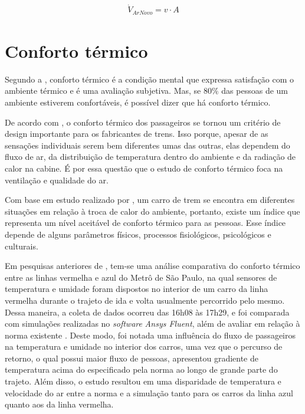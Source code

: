 \documentclass[acronym,symbols,table]{fei}
\begin{document}
\begin{equation} \label{eq:veloc}
\begin{aligned}
   \dot{V}_{ArNovo}=v\cdot{A}
\end{aligned}
\end{equation}

\section{Conforto térmico} \label{confortotermico}

Segundo a \textcite{ASHRAE2009}, conforto térmico é a condição mental que expressa satisfação com o ambiente térmico e é uma avaliação subjetiva. Mas, se $80\%$ das pessoas de um ambiente estiverem confortáveis, é possível dizer que há conforto térmico.

De acordo com \textcite{konstantinov2015numerical}, o conforto térmico dos passageiros se tornou um critério de design importante para os fabricantes de trens. Isso porque, apesar de as sensações individuais serem bem diferentes umas das outras, elas dependem do fluxo de ar, da distribuição de temperatura dentro do ambiente e da radiação de calor na cabine. É por essa questão que o estudo de conforto térmico foca na ventilação e qualidade do ar.

Com base em estudo realizado por \textcite{casellisimulaccao}, um carro de trem se encontra em diferentes situações em relação à troca de calor do ambiente, portanto, existe um índice que representa um nível aceitável de conforto térmico para as pessoas. Esse índice depende de alguns parâmetros físicos, processos fisiológicos, psicológicos e culturais. 

Em pesquisas anteriores de \textcite{TCCThomas}, tem-se uma análise comparativa do conforto térmico entre as linhas vermelha e azul do Metrô de São Paulo, na qual sensores de temperatura e umidade foram dispostos no interior de um carro da linha vermelha durante o trajeto de ida e volta usualmente percorrido pelo mesmo. Dessa maneira, a coleta de dados ocorreu das 16h08 às 17h29, e foi comparada com simulações realizadas no \textit{software} \textit{Ansys Fluent}, além de avaliar em relação à norma existente \textcite{handbook2006american}. Deste modo, foi notada uma influência do fluxo de passageiros na temperatura e umidade no interior dos carros, uma vez que o percurso de retorno, o qual possui maior fluxo de pessoas, apresentou gradiente de temperatura acima do especificado pela norma ao longo de grande parte do trajeto. Além disso, o estudo resultou em uma disparidade de temperatura e velocidade do ar entre a norma e a simulação tanto para os carros da linha azul quanto aos da linha vermelha.
\end{document}
